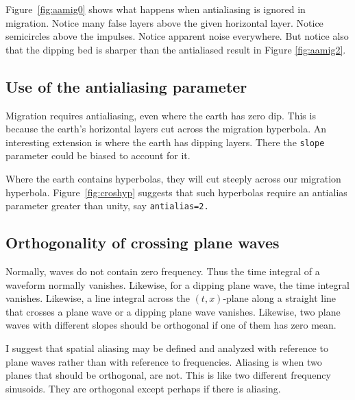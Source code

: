 Figure~\ref{fig:aamig0} shows what happens when antialiasing
is ignored in migration.
Notice many false layers above the given horizontal layer.
Notice semicircles above the impulses.
Notice apparent noise everywhere.
But notice also that the dipping bed is sharper
than the antialiased result in Figure \ref{fig:aamig2}.

\subsection{Use of the antialiasing parameter}

\par
Migration requires antialiasing, even where the earth has zero dip.
This is because the earth's horizontal layers
cut across the migration hyperbola.
An interesting extension is where the earth has dipping layers.
There the {\tt slope} parameter could be biased to account for it.
\par
Where the earth contains hyperbolas,
they will cut steeply across our migration hyperbola.
Figure~\ref{fig:croshyp} suggests
that such hyperbolas require
an antialias parameter greater than unity, say {\tt antialias=2.}

\subsection{Orthogonality of crossing plane waves}
Normally, waves do not contain zero frequency.
Thus the time integral of a waveform normally vanishes.
Likewise,
for a dipping plane wave, the time integral vanishes.
Likewise,
a line integral
across the $(t,x)$-plane
along a straight line that crosses a plane wave
or a dipping plane wave vanishes.
Likewise,
two plane waves with different slopes should be orthogonal
if one of them has zero mean.

\par
I suggest that spatial aliasing may be defined and analyzed
with reference to plane waves
rather than with reference to frequencies.
Aliasing is when two planes that should be orthogonal, are not.
This is like two different frequency sinusoids.
They are orthogonal except perhaps if there is aliasing.

